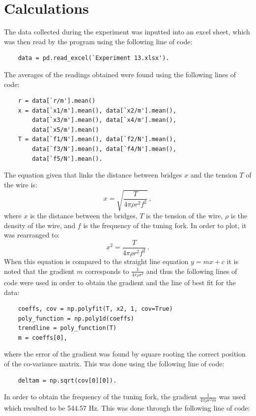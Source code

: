 \documentclass[12pt, a4paper]{article}
\begin{document}
\section*{Calculations}
The data collected during the experiment was inputted into an excel sheet, which was then read by the program using the following line of code:
\begin{verbatim}
    data = pd.read_excel(`Experiment 13.xlsx').
\end{verbatim}
The averages of the readings obtained were found using the following lines of code:
\begin{verbatim}
    r = data[`r/m'].mean()
    x = data[`x1/m'].mean(), data[`x2/m'].mean(),
        data[`x3/m'].mean(), data[`x4/m'].mean(),
        data[`x5/m'].mean()
    T = data[`f1/N'].mean(), data[`f2/N'].mean(),
        data[`f3/N'].mean(), data[`f4/N'].mean(), 
        data[`f5/N'].mean().
\end{verbatim}
The equation given that links the distance between bridges $x$ and the tension $T$ of the wire is:
\begin{equation} \label{eq: distance tension}
    x = \sqrt{\frac{T}{4 \pi \rho r^2 f^2}}\,,
\end{equation}
where $x$ is the distance between the bridges, $T$ is the tension of the wire, $\rho$ is the density of the wire, and $f$ is the frequency of the tuning fork. In order to plot, it was rearranged to:
\begin{equation}
    x^2 = \frac{T}{4 \pi \rho r^2 f^2}\,.
\end{equation}
When this equation is compared to the straight line equation $y = m x + c$ it is noted that the gradient $m$ corresponds to $\frac{1}{4 \pi \rho r^2}$ and thus the following lines of code were used in order to obtain the gradient and the line of best fit for the data:
\begin{verbatim}
    coeffs, cov = np.polyfit(T, x2, 1, cov=True)
    poly_function = np.poly1d(coeffs)
    trendline = poly_function(T)
    m = coeffs[0],
\end{verbatim}
where the error of the gradient was found by square rooting the correct position of the co-variance matrix. This was done using the following line of code:
\begin{verbatim}
    deltam = np.sqrt(cov[0][0]).
\end{verbatim}
In order to obtain the frequency of the tuning fork, the gradient $\frac{1}{4 \pi \rho r^2 m}$ was used which resulted to be 544.57 Hz. This was done through the following line of code:
\end{document}
